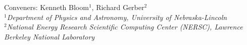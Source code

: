 

\begin{center}
{\large Conveners: Kenneth Bloom$^1$,  Richard Gerber$^2$}\\
\bigskip
$^1${\it Department of Physics and Astronomy, University of Nebraska-Lincoln}\\
$^2${\it National Energy Research Scientific Computing Center (NERSC), Lawrence Berkeley National Laboratory}\\
\end{center}


